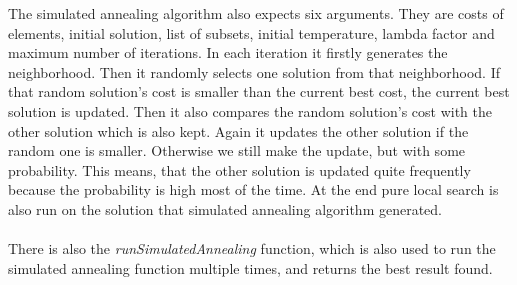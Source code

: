\documentclass{article}
\begin{document}
		The simulated annealing algorithm also expects six arguments. They are costs of elements, initial solution, list of subsets, initial temperature, lambda factor and maximum number of iterations. In each iteration it firstly generates the neighborhood. Then it randomly selects one solution from that neighborhood. If that random solution's cost is smaller than the current best cost, the current best solution is updated. Then it also compares the random solution's cost with the other solution which is also kept. Again it updates the other solution if the random one is smaller. Otherwise we still make the update, but with some probability. This means, that the other solution is updated quite frequently because the probability is high most of the time. At the end pure local search is also run on the solution that simulated annealing algorithm generated.
		\\ \\
		There is also the \textit{runSimulatedAnnealing} function, which is also used to run the simulated annealing function multiple times, and returns the best result found.
		\\
		
\end{document}

